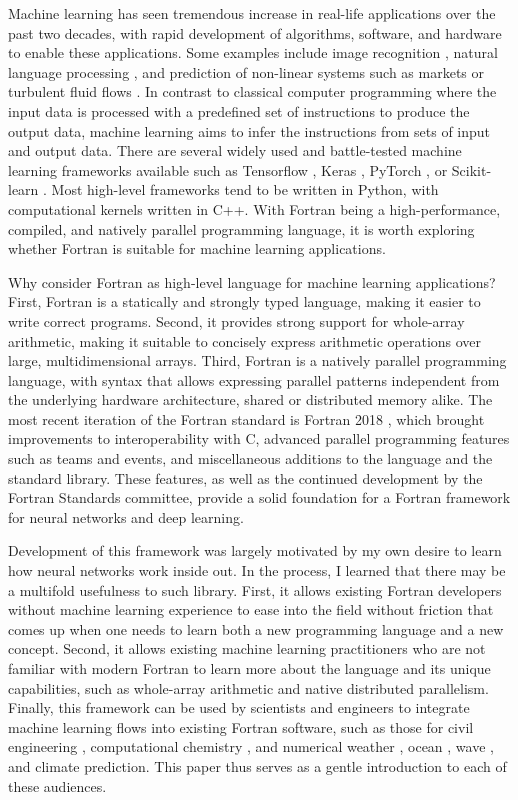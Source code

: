 \documentclass[sigplan, review=false, screen=true, balance=true]{acmart}
\begin{document}
Machine learning has seen tremendous increase in real-life applications
over the past two decades, with rapid development of algorithms, software,
and hardware to enable these applications. Some examples include image
recognition \citep{krizhevsky09}, natural language processing \citep{goldberg16},
and prediction of non-linear systems such as markets \citep{kimoto90} or
turbulent fluid flows \citep{kutz17}.
In contrast to classical computer programming where the input data is processed
with a predefined set of instructions to produce the output data, machine
learning aims to infer the instructions from sets of input and output data.
There are several widely used and battle-tested machine learning frameworks
available such as Tensorflow \citep{abadi16}, Keras \citep{chollet15},
PyTorch \citep{paszke17}, or Scikit-learn \citep{pendregosa11}.
Most high-level frameworks tend to be written in Python, with computational
kernels written in C++. With Fortran being a high-performance, compiled, and
natively parallel programming language, it is worth exploring whether Fortran
is suitable for machine learning applications.

Why consider Fortran as high-level language for machine learning applications?
First, Fortran is a statically and strongly typed language, making it
easier to write correct programs. Second, it provides strong support for whole-array
arithmetic, making it suitable to concisely express arithmetic operations over
large, multidimensional arrays. Third, Fortran is a natively parallel
programming language, with syntax that allows expressing parallel patterns
independent from the underlying hardware architecture, shared or distributed
memory alike. The most recent iteration of the Fortran standard is Fortran 2018
\citep{reid18}, which brought improvements to interoperability with C,
advanced parallel programming features such as teams and events, and
miscellaneous additions to the language and the standard library.
These features, as well as the continued development by
the Fortran Standards committee, provide a solid foundation for a
Fortran framework for neural networks and deep learning.

Development of this framework was largely motivated by my own desire to learn
how neural networks work inside out. In the process, I learned that there
may be a multifold usefulness to such library. First, it allows existing
Fortran developers without machine learning experience to ease into the field
without friction that comes up when one needs to learn both a new programming
language and a new concept.
Second, it allows existing machine learning practitioners who are not
familiar with modern Fortran to learn more about the language and its unique
capabilities, such as whole-array arithmetic and native distributed parallelism.
Finally, this framework can be used by scientists and engineers
to integrate machine learning flows into existing Fortran software, such as
those for civil engineering \citep{fischer08},
computational chemistry \citep{valiev10},
and numerical weather \citep{powers17}, ocean \citep{chassignet06},
wave \citep{donelan12}, and climate \citep{hurell13} prediction.
This paper thus serves as a gentle introduction to each of these audiences.
\end{document}
